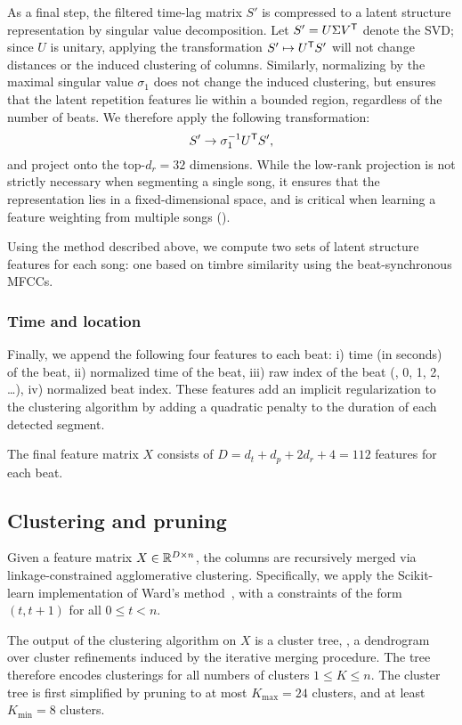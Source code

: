 \documentclass{article}
\begin{document}
As a final step, the filtered time-lag matrix $S'$ is compressed to a latent structure representation by singular
value decomposition.  
Let $S' = U\Sigma V^\mathsf{T}$ denote the SVD; since $U$ is unitary, applying the transformation $S' \mapsto U^\mathsf{T} S'$ 
will not change distances or the induced clustering of columns.  Similarly, normalizing by the maximal 
singular value $\sigma_1$ does not change the induced clustering, but ensures that the latent repetition features
lie within a bounded region, regardless of the number of beats.  We therefore apply the following
transformation:
\[
S' \rightarrow \sigma_1^{-1} U^\mathsf{T} S',
\]
and project onto the top-$d_r = 32$ dimensions.  While the low-rank projection is not strictly necessary when
segmenting a single song, it ensures that the representation lies in a fixed-dimensional space, and is critical
when learning a feature weighting from multiple songs ().

Using the method described above, we compute two sets of latent structure features for each song: one based on
timbre similarity using the beat-synchronous MFCCs.

\subsubsection{Time and location}
Finally, we append the following four features to each beat: i) time (in seconds) of the beat, ii) normalized
time of the beat, iii) raw index of the beat (\eg, 0, 1, 2, \dots), iv) normalized beat index.  These features
add an implicit regularization to the clustering algorithm by adding a quadratic penalty to the duration of each
detected segment.


The final feature matrix $X$ consists of $D = d_t + d_p + 2d_r + 4 = 112$ features for each beat.

\subsection{Clustering and pruning}

Given a feature matrix $X \in \mathbb{R}^{D \times n}$, the columns are recursively merged via linkage-constrained
agglomerative clustering.  Specifically, we apply the Scikit-learn implementation of Ward's
method~\cite{pedregosa2011scikit, ward1963hierarchical}, with a constraints of the form $(t, t+1)$ for all $0
\leq t < n$.

The output of the clustering algorithm on $X$ is a cluster tree, \ie, a dendrogram over cluster refinements
induced by the iterative merging procedure.  The tree therefore encodes clusterings for all numbers of clusters 
$1 \leq K \leq n$.  The cluster tree is first simplified by pruning to at most $K_{\max} = 24$ clusters, and 
at least $K_{\min}=8$ clusters.
\end{document}
